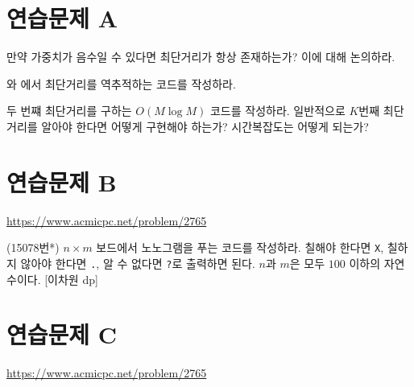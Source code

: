 \section{연습문제 A}
\begin{problem}
    만약 가중치가 음수일 수 있다면 최단거리가 항상 존재하는가? 이에 대해 논의하라.
\end{problem}
\begin{problem}
    와 에서 최단거리를 역추적하는 코드를 작성하라.
\end{problem}
\begin{problem}
    두 번쨰 최단거리를 구하는 $O(M \log M)$ 코드를 작성하라. 일반적으로 $K$번째 최단거리를 알아야 한다면 어떻게 구현해야 하는가? 시간복잡도는 어떻게 되는가?
\end{problem}

\section{연습문제 B}

\begin{problem} \url{https://www.acmicpc.net/problem/2765} \end{problem}

\begin{problem}
    (15078번*) $n \times m$ 보드에서 노노그램을 푸는 코드를 작성하라. 칠해야 한다면 \texttt{X}, 칠하지 않아야 한다면 \texttt{.}, 알 수 없다면 \texttt{?}로 출력하면 된다. $n$과 $m$은 모두 $100$ 이하의 자연수이다. [이차원 dp]
\end{problem}

\section{연습문제 C}

\begin{problem} \url{https://www.acmicpc.net/problem/2765} \end{problem}